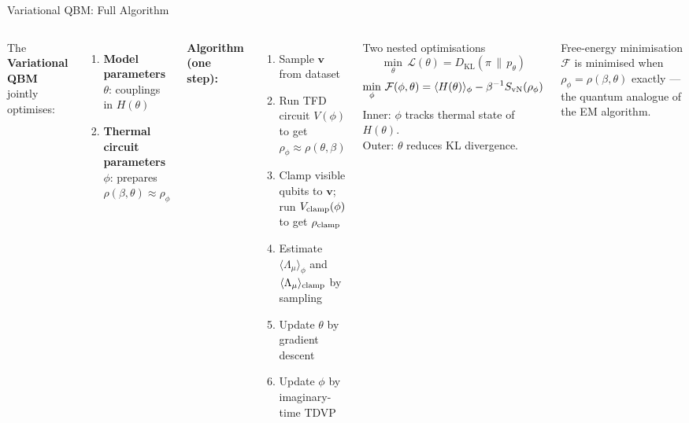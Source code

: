\documentclass[aspectratio=169,10pt]{beamer}
\newcommand{\KL}[2]{D_{\mathrm{KL}}\!\left(#1\,\|\,#2\right)}
\begin{document}
\begin{frame}{Variational QBM: Full Algorithm}
  \begin{columns}[T]
      The \textbf{Variational QBM} jointly optimises:
      \begin{enumerate}\itemsep1pt
        \item \textbf{Model parameters} $\theta$:
              couplings in $H(\theta)$
        \item \textbf{Thermal circuit parameters} $\phi$:
              prepares $\rho(\beta,\theta)\approx\rho_\phi$
      \end{enumerate}

      \textbf{Algorithm (one step):}
      \begin{enumerate}\itemsep1pt
        \item Sample $\mathbf{v}$ from dataset
        \item Run TFD circuit $V(\phi)$ to get
              $\rho_\phi\approx\rho(\theta,\beta)$
        \item Clamp visible qubits to $\mathbf{v}$;
              run $V_{\rm clamp}(\phi)$ to get $\rho_{\rm clamp}$
        \item Estimate $\langle\Lambda_\mu\rangle_\phi$
              and $\langle\Lambda_\mu\rangle_{\rm clamp}$
              by sampling
        \item Update $\theta$ by gradient descent
        \item Update $\phi$ by imaginary-time TDVP
      \end{enumerate}
      \begin{alertblock}{Two nested optimisations}
        \[
          \min_\theta\,\mathcal{L}(\theta)
          = \KL{\pi}{p_\theta}
        \]
        \[
          \min_\phi\,\mathcal{F}(\phi,\theta)
          = \langle H(\theta)\rangle_\phi
            - \beta^{-1}S_{\rm vN}(\rho_\phi)
        \]
        Inner: $\phi$ tracks thermal state of $H(\theta)$.\\
        Outer: $\theta$ reduces KL divergence.
      \end{alertblock}
      \vspace{0.15cm}
      \begin{block}{Free-energy minimisation}
        $\mathcal{F}$ is minimised when
        $\rho_\phi = \rho(\beta,\theta)$ exactly —
        the quantum analogue of the EM algorithm.
      \end{block}
  \end{columns}
\end{frame}
\end{document}
